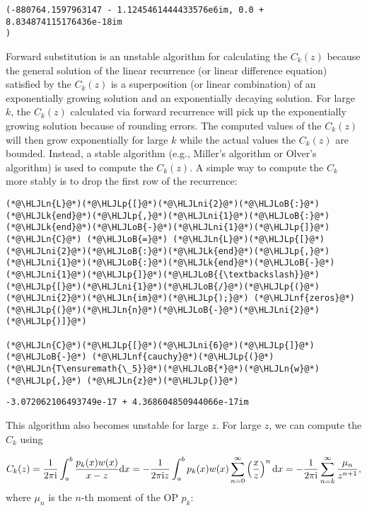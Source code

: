 \documentclass[12pt,a4paper]{article}
\newcommand{\HLJLk}[1]{\textcolor[RGB]{148,91,176}{\textbf{#1}}}
\newcommand{\HLJLn}[1]{#1}
\newcommand{\HLJLnf}[1]{\textcolor[RGB]{66,102,213}{#1}}
\newcommand{\HLJLni}[1]{\textcolor[RGB]{59,151,46}{#1}}
\newcommand{\HLJLoB}[1]{\textcolor[RGB]{102,102,102}{\textbf{#1}}}
\newcommand{\HLJLp}[1]{#1}
\def\D{ {\rm d} }
\def\I{ {\rm i} }
\begin{document}
\begin{lstlisting}
(-880764.1597963147 - 1.1245461444433576e6im, 0.0 + 8.834874115176436e-18im
)
\end{lstlisting}


Forward substitution is an unstable algorithm for calculating the $C_k(z)$ because the general solution of the linear recurrence (or linear difference equation) satisfied by the  $C_k(z)$ is a superposition (or linear combination) of an exponentially growing solution and an exponentially decaying solution. For large $k$, the $C_k(z)$ calculated via forward recurrence will pick up the exponentially growing solution because of rounding errors. The computed values of the $C_k(z)$ will then grow exponentially for large $k$ while the actual values the $C_k(z)$ are bounded. Instead, a stable algorithm (e.g., Miller's algorithm or Olver's algorithm) is used to compute the $C_k(z)$. A simple way to compute the $C_k$ more stably is to drop the first row of the recurrence:


\begin{lstlisting}
(*@\HLJLn{L}@*)(*@\HLJLp{[}@*)(*@\HLJLni{2}@*)(*@\HLJLoB{:}@*)(*@\HLJLk{end}@*)(*@\HLJLp{,}@*)(*@\HLJLni{1}@*)(*@\HLJLoB{:}@*)(*@\HLJLk{end}@*)(*@\HLJLoB{-}@*)(*@\HLJLni{1}@*)(*@\HLJLp{]}@*)
(*@\HLJLn{C}@*) (*@\HLJLoB{=}@*) (*@\HLJLn{L}@*)(*@\HLJLp{[}@*)(*@\HLJLni{2}@*)(*@\HLJLoB{:}@*)(*@\HLJLk{end}@*)(*@\HLJLp{,}@*)(*@\HLJLni{1}@*)(*@\HLJLoB{:}@*)(*@\HLJLk{end}@*)(*@\HLJLoB{-}@*)(*@\HLJLni{1}@*)(*@\HLJLp{]}@*)(*@\HLJLoB{{\textbackslash}}@*) (*@\HLJLp{[}@*)(*@\HLJLni{1}@*)(*@\HLJLoB{/}@*)(*@\HLJLp{(}@*)(*@\HLJLni{2}@*)(*@\HLJLn{im}@*)(*@\HLJLp{);}@*) (*@\HLJLnf{zeros}@*)(*@\HLJLp{(}@*)(*@\HLJLn{n}@*)(*@\HLJLoB{-}@*)(*@\HLJLni{2}@*)(*@\HLJLp{)]}@*)

(*@\HLJLn{C}@*)(*@\HLJLp{[}@*)(*@\HLJLni{6}@*)(*@\HLJLp{]}@*)(*@\HLJLoB{-}@*) (*@\HLJLnf{cauchy}@*)(*@\HLJLp{(}@*)(*@\HLJLn{T\ensuremath{\_5}}@*)(*@\HLJLoB{*}@*)(*@\HLJLn{w}@*)(*@\HLJLp{,}@*) (*@\HLJLn{z}@*)(*@\HLJLp{)}@*)
\end{lstlisting}

\begin{lstlisting}
-3.072062106493749e-17 + 4.368604850944066e-17im
\end{lstlisting}


This algorithm also becomes unstable for large $z$.  For large $z$, we can compute the $C_k$ using

\[
C_k(z) = {1 \over 2\pi \I}\int_{a}^{b}{p_k(x)w(x) \over x - z} \D x = -{1 \over 2\pi \I z}\int_{a}^{b} p_k(x)w(x)\sum_{n=0}^{\infty}\left({x\over z}\right)^n  \D x =  -{1 \over 2\pi \I }\sum_{n=k}^{\infty} {\mu_n\over z^{n+1}},
\]
where $\mu_n$ is the $n$-th moment of the OP $p_k$:
\end{document}
